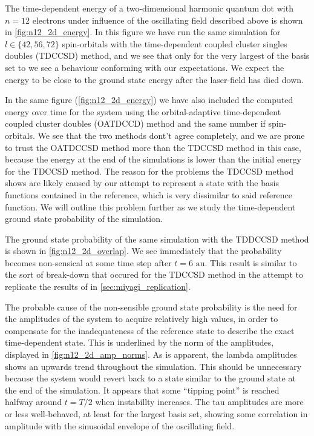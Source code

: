 The time-dependent energy of a two-dimensional harmonic quantum dot with $n=12$
electrons under influence of the oscillating field described above is shown in 
\autoref{fig:n12_2d_energy}. In this figure we have run the same simulation for 
$l\in\{42,56,72\}$ spin-orbitals with the time-dependent coupled cluster 
singles doubles (TDCCSD) method, and we see that only for the very largest of the 
basis set to we see a behaviour conforming with our expectations. We expect the 
energy to be close to the ground state energy after the laser-field has died down.

In the same figure (\autoref{fig:n12_2d_energy}) we have also included
the computed energy over time for the system using the
orbital-adaptive time-dependent coupled cluster doubles (OATDCCD) method and the 
same number if spin-orbitals.
We see that the two methods dont't agree completely, and we are prone to trust 
the OATDCCSD method more than the TDCCSD method in this case, because the energy at 
the end of the simulations is lower than the initial energy for the TDCCSD method.
The reason for the problems the TDCCSD method shows are likely caused by our attempt 
to represent a state with the basis functions contained in the reference,
which is very dissimilar to said reference function. We will outline this problem 
further as we study the time-dependent ground state probability of the simulation.

The ground state probability of the same simulation with the TDDCCSD method 
is shown in
\autoref{fig:n12_2d_overlap}. We see immediately that the probability becomes 
non-sensical at some time step after $t=6 \text{ au}$. This result is similar to
the sort of break-down that occured for the TDCCSD method in the attempt to 
replicate the results of \citeauthor{miyagi2013time}\cite{miyagi2013time} in
\autoref{sec:miyagi_replication}.

The probable cause of the non-sensible 
ground state probability is the need for the amplitudes of the system to acquire 
relatively high values, in order to compensate for the inadequateness of the 
reference state to describe the exact time-dependent state. This is underlined 
by the norm of the amplitudes, displayed in \autoref{fig:n12_2d_amp_norms}. As 
is apparent, the lambda amplitudes shows an upwards trend throughout the 
simulation.
This should be unnecessary because the system would revert back to a state 
similar to the ground state at the end of the simulation. It appears that 
some ``tipping point'' is reached halfway around $t=T/2$ when instabillty 
increases. The tau amplitudes are more or less well-behaved, at least for 
the largest basis set, showing some correlation in amplitude with the
sinusoidal envelope of the oscillating field.

